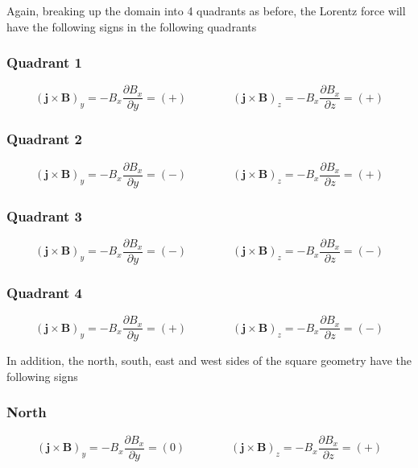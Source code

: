 \documentclass[11pt]{article}
\begin{document}
Again, breaking up the domain into 4 quadrants as before, the Lorentz force will have the following signs in the following quadrants
\subsubsection{Quadrant 1}
\begin{equation}
	(\pmb{j} \times \pmb{B})_y = - B_x \frac{\partial B_x}{\partial y} = (+)
	\qquad \qquad
	(\pmb{j} \times \pmb{B})_z = - B_x \frac{\partial B_x}{\partial z} = (+)
\end{equation}

\subsubsection{Quadrant 2}
\begin{equation}
	(\pmb{j} \times \pmb{B})_y = - B_x \frac{\partial B_x}{\partial y} = (-)
	\qquad \qquad
	(\pmb{j} \times \pmb{B})_z = - B_x \frac{\partial B_x}{\partial z} = (+)
\end{equation}
\subsubsection{Quadrant 3}
\begin{equation}
	(\pmb{j} \times \pmb{B})_y = - B_x \frac{\partial B_x}{\partial y} = (-)
	\qquad \qquad
	(\pmb{j} \times \pmb{B})_z = - B_x \frac{\partial B_x}{\partial z} = (-)
\end{equation}
\subsubsection{Quadrant 4}
\begin{equation}
	(\pmb{j} \times \pmb{B})_y = - B_x \frac{\partial B_x}{\partial y} = (+)
	\qquad \qquad
	(\pmb{j} \times \pmb{B})_z = - B_x \frac{\partial B_x}{\partial z} = (-)
\end{equation}

In addition, the north, south, east and west sides of the square geometry have the following signs
\subsubsection{North}
\begin{equation}
	(\pmb{j} \times \pmb{B})_y = - B_x \frac{\partial B_x}{\partial y} = (0)
	\qquad \qquad
	(\pmb{j} \times \pmb{B})_z = - B_x \frac{\partial B_x}{\partial z} = (+)
\end{equation}
\end{document}
